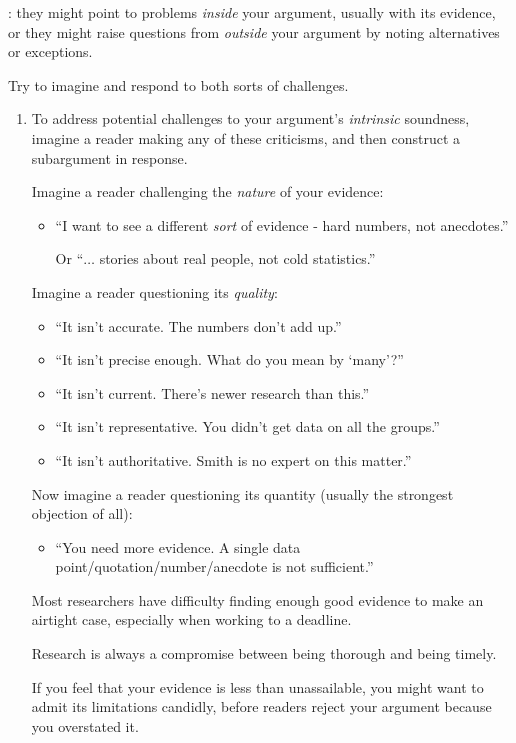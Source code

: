 \documentclass[oneside]{book}
\numberwithin{equation}{section}
\begin{document}
%
: they might point to problems \textit{inside} your argument, usually with its evidence, or they might raise questions from \textit{outside} your argument by noting alternatives or exceptions.

Try to imagine and respond to both sorts of challenges.
\begin{enumerate}
    \item To address potential challenges to your argument's \textit{intrinsic} soundness, imagine a reader making any of these criticisms, and then construct a subargument in response.
    
    Imagine a reader challenging the \textit{nature} of your evidence:
    \begin{itemize}
        \item ``I want to see a different \textit{sort} of evidence - hard numbers, not anecdotes.''
        
        Or ``$\ldots$ stories about real people, not cold statistics.''
    \end{itemize}
    Imagine a reader questioning its \textit{quality}:
    \begin{itemize}
        \item ``It isn't accurate. The numbers don't add up.''
        \item ``It isn't precise enough. What do you mean by `many'?''
        \item ``It isn't current. There's newer research than this.''
        \item ``It isn't representative. You didn't get data on all the groups.''
        \item ``It isn't authoritative. Smith is no expert on this matter.''
    \end{itemize}
    Now imagine a reader questioning its quantity (usually the strongest objection of all):
    \begin{itemize}
        \item ``You need more evidence. A single data point/quotation/number/anecdote is not sufficient.''
    \end{itemize}
    Most researchers have difficulty finding enough good evidence to make an airtight case, especially when working to a deadline.
    
    Research is always a compromise between being thorough and being timely.
    
    If you feel that your evidence is less than unassailable, you might want to admit its limitations candidly, before readers reject your argument because you overstated it.
    

\end{enumerate}
\end{document}
